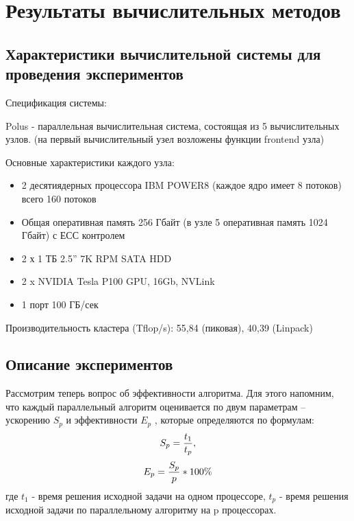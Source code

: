 \section{Результаты вычислительных методов}

\subsection{Характеристики вычислительной системы для проведения экспериментов}

Спецификация системы: 

 Polus - параллельная вычислительная система, состоящая из 5 вычислительных узлов. (на первый вычислительный узел возложены функции frontend узла)
 
\noindent Основные характеристики каждого узла:
\begin{itemize}
    \item 2 десятиядерных процессора IBM POWER8 (каждое ядро имеет 8 потоков) всего 160 потоков
    \item Общая оперативная память 256 Гбайт (в узле 5 оперативная память 1024 Гбайт) с ЕСС контролем
    \item 2 х 1 ТБ 2.5” 7K RPM SATA HDD
    \item 2 x NVIDIA Tesla P100 GPU, 16Gb, NVLink
    \item 1 порт 100 ГБ/сек
\end{itemize}

\noindent Производительность кластера (Tflop/s): 55,84 (пиковая), 40,39 (Linpack) \\

\subsection{Описание экспериментов}
Рассмотрим теперь вопрос об эффективности алгоритма. Для этого напомним, что
каждый параллельный алгоритм оценивается по двум параметрам – ускорению $S_p$ и
эффективности $E_p$ , которые определяются по формулам:
$$S_p = {{t_1} \over {t_p}},$$ $$E_p = {S_p \over p} * 100\%$$
где $t_1$ - время решения исходной задачи на одном процессоре, $t_p$ - время
решения исходной задачи по параллельному алгоритму на p процессорах.

